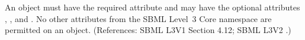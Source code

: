 An \EventAssignment object must have the required attribute
 and may have the optional attributes , ,  and
.  No other attributes from the SBML Level~3 Core namespace
are permitted on an \EventAssignment object.  (References: SBML L3V1 Section 4.12; SBML L3V2
.)
